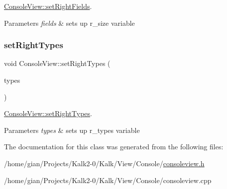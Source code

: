 \hyperlink{class_console_view_a2b9ba00770ebdeda35f2b506c752248e}{Console\+View\+::set\+Right\+Fields}. 


\begin{DoxyParams}{Parameters}
{\em fields} & sets up r\+\_\+size variable \\
\hline
\end{DoxyParams}
\mbox{\label{class_console_view_a96f03ac06e40ae1d45601ac9f11863c4}} 
\subsubsection{\texorpdfstring{set\+Right\+Types}{setRightTypes}}
{\footnotesize\ttfamily void Console\+View\+::set\+Right\+Types (\begin{DoxyParamCaption}\item[{const Q\+Vector$<$ Q\+String $>$}]{types }\end{DoxyParamCaption})\hspace{0.3cm}{\ttfamily [slot]}}



\hyperlink{class_console_view_a96f03ac06e40ae1d45601ac9f11863c4}{Console\+View\+::set\+Right\+Types}. 


\begin{DoxyParams}{Parameters}
{\em types} & sets up r\+\_\+types variable \\
\hline
\end{DoxyParams}


The documentation for this class was generated from the following files\+:\begin{DoxyCompactItemize}
\item 
/home/gian/\+Projects/\+Kalk2-\/0/\+Kalk/\+View/\+Console/\hyperlink{consoleview_8h}{consoleview.\+h}\item 
/home/gian/\+Projects/\+Kalk2-\/0/\+Kalk/\+View/\+Console/consoleview.\+cpp\end{DoxyCompactItemize}
